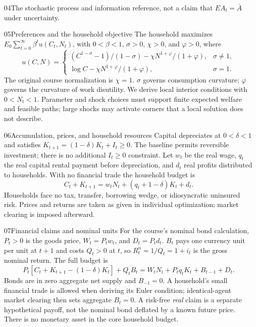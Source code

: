 \begin{modelsetup}[1]
\begin{modelcondition}{04}{The stochastic process and information}
reference, not a claim that $E A_t=\bar A$ under uncertainty.
\end{modelcondition}
\begin{modelcondition}{05}{Preferences and the household objective}
The household maximizes $E_0\sum_{t=0}^\infty\beta^t u(C_t,N_t)$, with
$0<\beta<1$, $\sigma>0$, $\chi>0$, and $\varphi>0$, where
\[
u(C,N)=
\begin{cases}
(C^{1-\sigma}-1)/(1-\sigma)-\chi N^{1+\varphi}/(1+\varphi),&\sigma\ne1,\\
\log C-\chi N^{1+\varphi}/(1+\varphi),&\sigma=1.
\end{cases}
\]
The original course normalization is $\chi=1$. $\sigma$ governs consumption
curvature; $\varphi$ governs the curvature of work disutility. We derive local
interior conditions with $0<N_t<1$. Parameter and shock choices must support
finite expected welfare and feasible paths; large shocks may activate corners
that a local solution does not describe.
\end{modelcondition}
\begin{modelcondition}{06}{Accumulation, prices, and household resources}
Capital depreciates at $0<\delta<1$ and satisfies
$K_{t+1}=(1-\delta)K_t+I_t\geq0$. The baseline permits reversible investment;
there is no additional $I_t\geq0$ constraint. Let $w_t$ be the real wage,
$q_t$ the real capital rental payment before depreciation, and $d_t$ real
profits distributed to households. With no financial trade the household budget is
\[
C_t+K_{t+1}=w_tN_t+(q_t+1-\delta)K_t+d_t.
\]
Households face no tax, transfer, borrowing wedge, or idiosyncratic uninsured
risk. Prices and returns are taken as given in individual optimization;
market clearing is imposed afterward.
\end{modelcondition}
\begin{modelcondition}{07}{Financial claims and nominal units}
For the course's nominal bond calculation, $P_t>0$ is the goods price,
$W_t=P_tw_t$, and $D_t=P_td_t$. $B_t$ pays one currency unit per unit at $t+1$
and costs $Q_t>0$ at $t$, so $R_t^n=1/Q_t=1+i_t$ is the gross nominal return.
The full budget is
\[
P_t[C_t+K_{t+1}-(1-\delta)K_t]+Q_tB_t
 =W_tN_t+P_tq_tK_t+B_{t-1}+D_t.
\]
Bonds are in zero aggregate net supply and $B_{-1}=0$. A household's small
financial trade is allowed when deriving its Euler condition; identical-agent
market clearing then sets aggregate $B_t=0$. A risk-free \emph{real} claim is
a separate hypothetical payoff, not the nominal bond deflated by a known
future price. There is no monetary asset in the core household budget.

\end{modelcondition}
\end{modelsetup}

